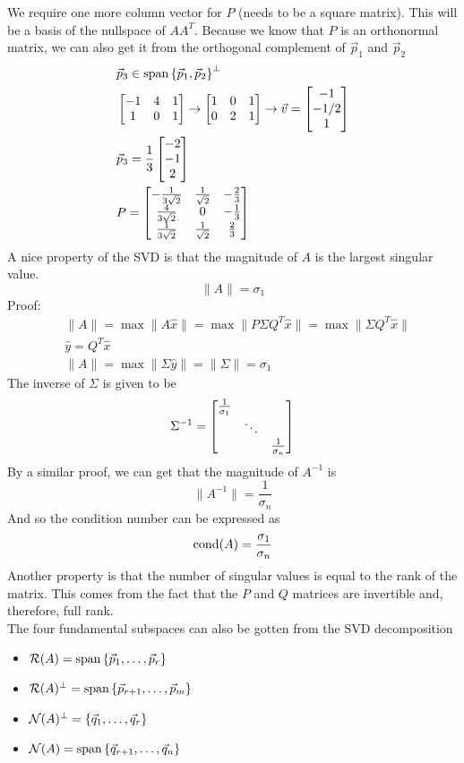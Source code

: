 \documentclass[11pt, fleqn]{article}
\begin{document}
We require one more column vector for $P$ (needs to be a square matrix). This will be a basis of the nullspace of $AA^T$. Because we know that $P$ is an orthonormal matrix, we can also get it from the orthogonal complement of $\vec{p}_1$ and $\vec{p}_2$
\begin{align*}
    &\vec{p}_3\in\spann\brcurly{\vec{p}_1,\vec{p}_2}^\perp\\
    &\matrixx{-1 & 4 & 1\\ 1 & 0 & 1}\to\matrixx{1 & 0 & 1\\ 0 & 2 & 1}\to \vec{v}=\matrixx{-1\\-1/2\\1}\\
    &\vec{p}_3=\frac{1}{3}\matrixx{-2\\-1\\2}\\
    &P=\matrixx{-\frac{1}{3\sqrt{2}} & \frac{1}{\sqrt{2}} & -\frac{2}{3}\\ \frac{4}{3\sqrt{2}} & 0 & -\frac{1}{3}\\ \frac{1}{3\sqrt{2}} & \frac{1}{\sqrt{2}} & \frac{2}{3}}
\end{align*}
A nice property of the SVD is that the magnitude of $A$ is the largest singular value.
$$\|A\|=\sigma_1$$
Proof:
\begin{align*}
    &\|A\|=\max\|A\hat{x}\|=\max\|P\Sigma Q^T\hat{x}\|=\max\|\Sigma Q^T\hat{x}\|\\
    &\hat{y}=Q^T\hat{x}\\
    &\|A\|=\max\|\Sigma\hat{y}\|=\|\Sigma\|=\sigma_1
\end{align*}
The inverse of $\Sigma$ is given to be
$$\Sigma^{-1}=\matrixx{\frac{1}{\sigma_1} & & \\ & \ddots & \\ & & \frac{1}{\sigma_n}}$$
By a similar proof, we can get that the magnitude of $A^{-1}$ is
$$\|A^{-1}\|=\frac{1}{\sigma_n}$$
And so the condition number can be expressed as
$$\operatorname{cond}(A)=\frac{\sigma_1}{\sigma_n}$$
Another property is that the number of singular values is equal to the rank of the matrix. This comes from the fact that the $P$ and $Q$ matrices are invertible and, therefore, full rank.\\
The four fundamental subspaces can also be gotten from the SVD decomposition
\begin{itemize}
    \item $\mathcal{R}(A)=\operatorname{span}\left\{ \vec{p}_1,\ldots,\vec{p}_r \right\}$
    \item $\mathcal{R}(A)^\perp=\operatorname{span}\left\{ \vec{p}_{r+1},\ldots,\vec{p}_m \right\}$
    \item $\mathcal{N}(A)^\perp=\left\{ \vec{q}_1,\ldots,\vec{q}_r \right\}$
    \item $\mathcal{N}(A)=\operatorname{span}\left\{ \vec{q}_{r+1},\ldots,\vec{q}_n \right\}$
\end{itemize}
\end{document}
